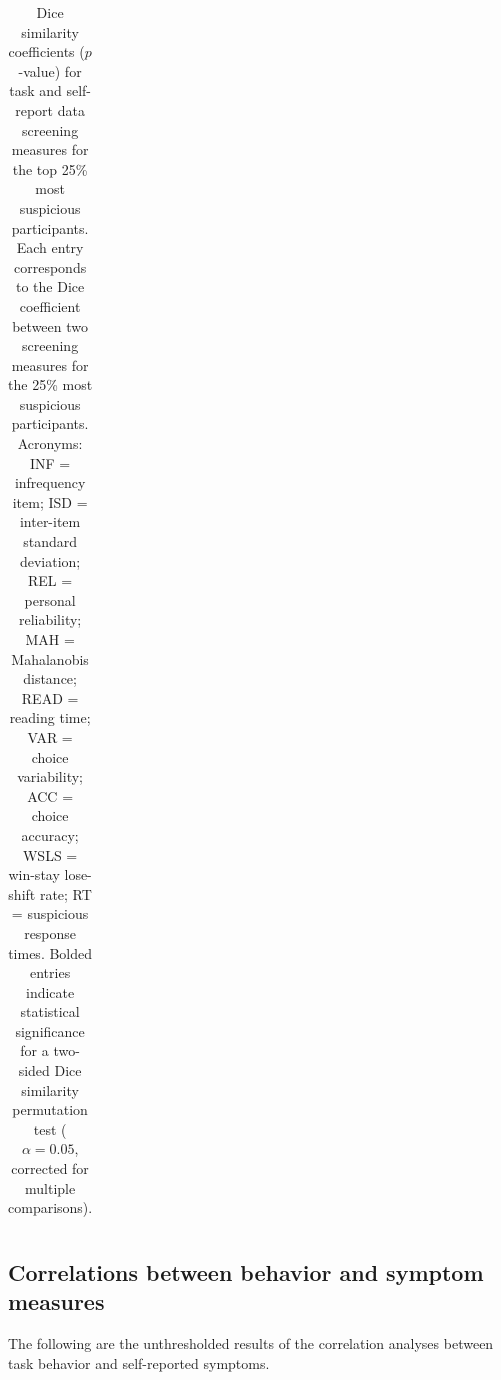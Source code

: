 \documentclass[a4paper,notitlepage,12pt]{article}
\begin{document}
\begin{table}[H]
\begin{adjustbox}{center}
\begin{tabular}{rccccccccc}
        \bottomrule
    \end{tabular}
    \end{adjustbox}
    \caption{Dice similarity coefficients ($p$-value) for task and self-report data screening measures for the top 25\% most suspicious participants. Each entry corresponds to the Dice coefficient between two screening measures for the 25\% most suspicious participants. Acronyms: INF = infrequency item; ISD = inter-item standard deviation; REL = personal reliability; MAH = Mahalanobis distance; READ = reading time; VAR = choice variability; ACC = choice accuracy; WSLS = win-stay lose-shift rate; RT = suspicious response times. Bolded entries indicate statistical significance for a two-sided Dice similarity permutation test ($\alpha = 0.05$, corrected for multiple comparisons).}
    \label{tab:tabS05}
\end{table}

\clearpage
\subsection*{Correlations between behavior and symptom measures}

The following are the unthresholded results of the correlation analyses between task behavior and self-reported symptoms.  
\end{document}
